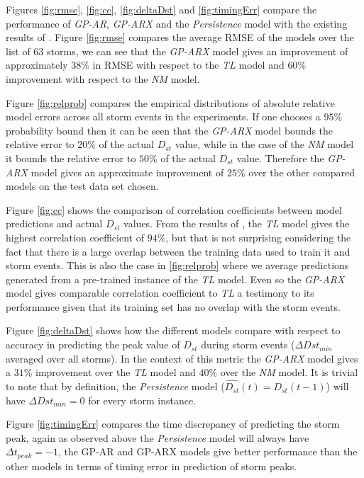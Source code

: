 \documentclass[referee,a4paper,12pt,traditabstract]{swsc}
\begin{document}
\begin{linenumbers}
Figures \ref{fig:rmse}, \ref{fig:cc}, \ref{fig:deltaDst} and \ref{fig:timingErr} compare the performance of \emph{GP-AR}, \emph{GP-ARX} and the \emph{Persistence} model with the existing results of \citet{Ji2012}. Figure \ref{fig:rmse} compares the average RMSE of the models over the list of 63 storms, we can see that the \emph{GP-ARX} model gives an improvement of approximately $38\%$ in RMSE with respect to the \emph{TL} model and $60\%$ improvement with respect to the \emph{NM} model. 

Figure \ref{fig:relprob} compares the empirical distributions of absolute relative model errors across all storm events in the experiments. If one chooses a $95\%$ probability bound then it can be seen that the \emph{GP-ARX} model bounds the relative error to $20\%$ of the actual $D_{st}$ value, while in the case of the \emph{NM} model it bounds the relative error to $50\%$ of the actual $D_{st}$ value. Therefore the \emph{GP-ARX} model gives an approximate improvement of $25\%$ over the other compared models on the test data set chosen.

Figure \ref{fig:cc} shows the comparison of correlation coefficients between model predictions and actual $D_{st}$ values. From the results of \citet{Ji2012}, the \emph{TL} model gives the highest correlation coefficient of $94\%$, but that is not surprising considering the fact that there is a large overlap between the training data used to train it and storm events. This is also the case in \ref{fig:relprob} where we average predictions generated from a pre-trained instance of the \emph{TL} model. Even so the \emph{GP-ARX} model gives comparable correlation coefficient to \emph{TL} a testimony to its performance given that its training set has no overlap with the storm events.

Figure \ref{fig:deltaDst} shows how the different models compare with respect to accuracy in predicting the peak value of $D_{st}$ during storm events ($\Delta Dst_{min}$ averaged over all storms). In the context of this metric the \emph{GP-ARX} model gives a $31\%$ improvement over the \emph{TL} model and $40\%$ over the \emph{NM} model. It is trivial to note that by definition, the \emph{Persistence} model ($\hat{D_{st}}(t) = D_{st}(t-1)$) will have $\Delta Dst_{min} = 0$ for every storm instance.

Figure \ref{fig:timingErr} compares the time discrepancy of predicting the storm peak, again as observed above the \emph{Persistence} model will always have $\Delta t_{peak} = -1$, the GP-AR and GP-ARX models give better performance than the other models in terms of timing error in prediction of storm peaks. 


\end{linenumbers}
\end{document}
